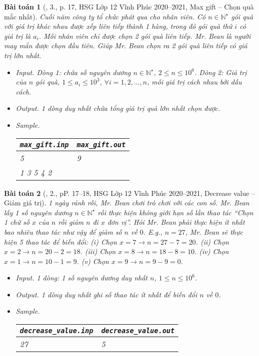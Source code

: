 \documentclass{article}
\newtheorem{baitoan}{Bài toán}
\begin{document}
\begin{baitoan}[\cite{Trung_HSG_THPT_Tin}, 3., p. 17, HSG Lớp 12 Vĩnh Phúc 2020--2021, Max gift -- Chọn quà mắc nhất]
	Cuối năm công ty tổ chức phát qua cho nhân viên. Có $n\in\mathbb{N}^\star$ gói quà với giá trị khác nhau được xếp liên tiếp thành 1 hàng, trong đó gói quà thứ $i$ có giá trị là $a_i$. Mỗi nhân viên chỉ được chọn 2 gói quà liên tiếp. Mr. Bean là người may mắn được chọn đầu tiên. Giúp Mr. Bean chọn ra 2 gói quà liên tiếp có giá trị lớn nhất.
	\begin{itemize}
		\item {\sf Input.} Dòng 1: chứa số nguyên dương $n\in\mathbb{N}^\star$, $2\le n\le10^6$. Dòng 2: Giá trị của $n$ gói quà, $1\le a_i\le10^3$, $\forall i = 1,2,\ldots,n$, mỗi giá trị cách nhau bởi dấu cách.
		\item {\sf Output.} 1 dòng duy nhất chứa tổng giá trị quà lớn nhất chọn được.
		\item {\sf Sample.}
		\begin{table}[H]
			\centering
			\begin{tabular}{|l|l|}
				\hline
				\verb|max_gift.inp| & \verb|max_gift.out| \\
				\hline
				5 & 9 \\
				1 3 5 4 2 &  \\
				\hline
			\end{tabular}
		\end{table}
	\end{itemize}
\end{baitoan}

\begin{baitoan}[\cite{Trung_HSG_THPT_Tin}, 2., pP. 17--18, HSG Lớp 12 Vĩnh Phúc 2020--2021, Decrease value -- Giảm giá trị]
	1 ngày rảnh rỗi, Mr. Bean chơi trò chơi với các con số. Mr. Bean lấy 1 số nguyên dương $n\in\mathbb{N}^\star$ rồi thực hiện không giới hạn số lần thao tác ``Chọn 1 chữ số $x$ của $n$ rồi giảm $n$ đi $x$ đơn vị''. Hỏi Mr. Bean phải thực hiện ít nhất bao nhiêu thao tác như vậy để giảm số $n$ về $0$. E.g., $n = 27$, Mr. Bean sẽ thực hiện 5 thao tác để biến đổi: (i) Chọn $x = 7\to n = 27 - 7 = 20$. (ii) Chọn $x = 2\to n = 20 - 2 = 18$. (iii) Chọn $x = 8\to n = 18 - 8 = 10$. (iv) Chọn $x = 1\to n = 10 - 1 = 9$. (v) Chọn $x = 9\to n = 9 - 9 = 0$.
	\begin{itemize}
		\item {\sf Input.} 1 dòng: 1 số nguyên dương duy nhất $n$, $1\le n\le10^6$.
		\item {\sf Output.} 1 dòng duy nhất ghi số thao tác ít nhất để biến đổi $n$ về $0$.
		\item {\sf Sample.}
		\begin{table}[H]
			\centering
			\begin{tabular}{|l|l|}
				\hline
				\verb|decrease_value.inp| & \verb|decrease_value.out| \\
				\hline
				27 & 5 \\
				\hline
			\end{tabular}
		\end{table}
	\end{itemize}
\end{baitoan}
\end{document}
